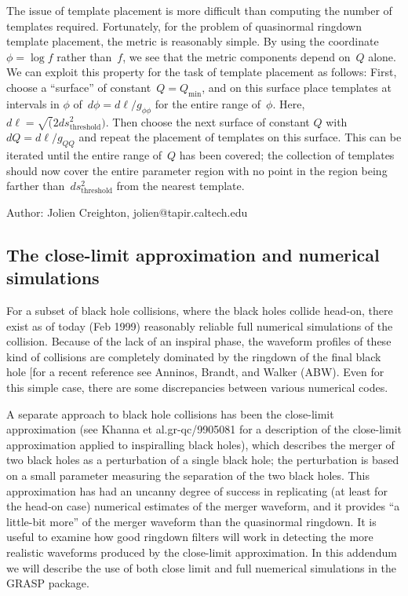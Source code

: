 The issue of template placement is more difficult than computing the number
of templates required.  Fortunately, for the problem of quasinormal ringdown
template placement, the metric is reasonably simple.  By using the coordinate
$\phi=\log f$ rather than~$f$, we see that the metric components depend
on~$Q$ alone.  We can exploit this property for the task of template placement
as follows:  First, choose a ``surface'' of
constant~$Q=Q_{\mathrm{\scriptstyle min}}$, and on this surface place templates
at intervals in $\phi$ of~$d\phi=d\ell/g_{\phi\phi}$ for the entire range
of~$\phi$.  Here, $d\ell=\surd(2ds^2_{\mathrm{\scriptstyle threshold}})$.
Then choose the next surface of constant $Q$ with~$dQ=d\ell/g_{QQ}$ and repeat
the placement of templates on this surface.  This can be iterated until the
entire range of~$Q$ has been covered; the collection of templates should now
cover the entire parameter region with no point in the region being farther
than~$ds^2_{\mathrm{\scriptstyle threshold}}$ from the nearest template.

\begin{description}
\item{Author:}  Jolien Creighton, jolien@tapir.caltech.edu
\end{description}


\clearpage
\subsection{The close-limit approximation and numerical simulations}

For a subset of black hole collisions, where the black holes collide
head-on, there exist as of today (Feb 1999) reasonably reliable full
numerical simulations of the collision.  Because of the lack of an
inspiral phase, the waveform profiles of these kind of collisions are
completely dominated by the ringdown of the final black hole [for a
recent reference see Anninos, Brandt, and Walker \cite{ABW} (ABW).  Even for this simple case, there are some
discrepancies between various numerical codes. 

A separate approach to black hole collisions has been the 
close-limit approximation (see Khanna et al.\@ gr-qc/9905081 for a description
of the close-limit approximation applied to inspiralling black holes), which
describes the merger of two black holes as a perturbation of a single black
hole; the perturbation is based on a small parameter measuring the separation
of the two black holes.  This approximation has had an uncanny degree of
success in replicating (at least for the head-on case) 
numerical estimates of the merger waveform, and
it provides ``a little-bit more'' of the merger waveform than the
quasinormal ringdown.  It is useful to examine how good ringdown filters
will work in detecting the more realistic waveforms produced by the
close-limit approximation.  In this addendum we will describe the use
of both close limit and full nuemerical simulations in the GRASP package.

